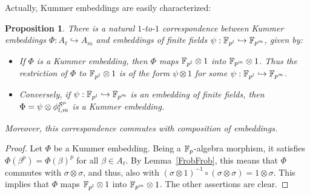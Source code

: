 \documentclass{sig-alternate}
\newtheorem{proposition}[theorem]{Proposition}
\begin{document}
Actually, Kummer embeddings are easily characterized:
\begin{proposition}
\label{Phipsi}
There is a natural $1$-to-$1$ correspondence between Kummer embeddings $\Phi:A_\ell\hookrightarrow A_m$
and embeddings of finite fields $\psi:\mathbb{F}_{p^l}\hookrightarrow\mathbb{F}_{p^m}$, given by:
\begin{itemize}
\item If $\Phi$ is a Kummer embedding, then $\Phi$ maps $\mathbb{F}_{p^l}\otimes1$ into $\mathbb{F}_{p^m}\otimes 1$.
Thus the restriction of $\Phi$ to $\mathbb{F}_{p^l}\otimes1$ is of the form $\psi\otimes1$ for some $\psi:\mathbb{F}_{p^l}\hookrightarrow\mathbb{F}_{p^m}$.
\item Conversely, if $\psi:\mathbb{F}_{p^l}\hookrightarrow\mathbb{F}_{p^m}$ is an embedding of finite fields, then $\Phi=\psi\otimes{\phi^{\mathcal{S}^\mu}_{{l},{m}}}$
is a Kummer embedding.
\end{itemize}
Moreover, this correspondence commutes with composition of embeddings.
\end{proposition}
\begin{proof}
Let $\Phi$ be a Kummer embedding. Being a $\mathbb{F}_{p}$-algebra morphism, it satisfies $\Phi(\beta^p)=\Phi(\beta)^p$ for all $\beta\in A_\ell$.
By Lemma~\ref{FrobFrob}, this means that $\Phi$ commutes with $\sigma\otimes\sigma$, and thus,
also with $(\sigma\otimes 1)^{-1}\circ(\sigma\otimes\sigma)=1\otimes\sigma$.
This implies that $\Phi$ maps $\mathbb{F}_{p^l}\otimes1$ into $\mathbb{F}_{p^m}\otimes 1$.
The other assertions are clear.
\end{proof}
\end{document}
